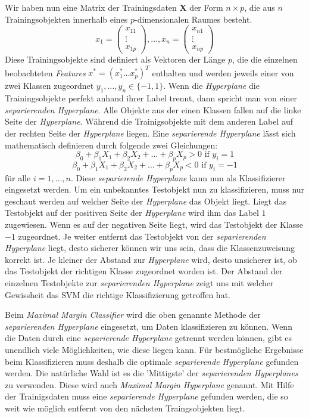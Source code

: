 Wir haben nun eine Matrix der Trainingsdaten $\mathbf{X}$ der Form $n \times p$, 
die aus $n$ Trainingsobjekten innerhalb eines $p$-dimensionalen Raumes besteht.
\[x_1 = \left(\begin{array}{c} x_{11} \\ \vdots \\ x_{1p} \end{array}\right) 
  , \dots, 
  x_n = \left(\begin{array}{c} x_{n1} \\ \vdots \\ x_{np} \end{array}\right) \]
Diese Trainingsobjekte sind definiert als Vektoren der Länge $p$, die die einzelnen beobachteten \textit{Features} 
$x^* = (x_1^* \dots x_p^*)^T$ enthalten und werden jeweils einer von zwei Klassen zugeordnet $y_1,\dots,y_n \in \{-1,1\}$.
Wenn die \textit{Hyperplane} die Trainingsobjekte perfekt anhand ihrer Label trennt,
dann spricht man von einer \textit{separierenden Hyperplane}. 
Alle Objekte aus der einen Klassen fallen auf die linke Seite der \textit{Hyperplane}.
Während die Trainigsobjekte mit dem anderen Label auf der rechten Seite der \textit{Hyperplane} liegen.
Eine \textit{separierende Hyperplane} lässt sich mathematisch definieren durch folgende zwei Gleichungen:
\[\beta_0 + \beta_1X_1 + \beta_2X_2  + \dots + \beta_pX_p> 0 \text{ if } y_i = 1\]
\[\beta_0 + \beta_1X_1 + \beta_2X_2  + \dots + \beta_pX_p< 0 \text{ if } y_i = -1\]
für alle $i = 1 , \dots, n$.
Diese \textit{separierende Hyperplane} kann nun als Klassifizierer eingesetzt werden. 
Um ein unbekanntes Testobjekt nun zu klassifizieren, muss nur geschaut werden auf welcher Seite der \textit{Hyperplane} das Objekt liegt.
Liegt das Testobjekt auf der positiven Seite der \textit{Hyperplane} wird ihm das Label $1$ zugewiesen.
Wenn es auf der negativen Seite liegt, wird das Testobjekt der Klasse $-1$ zugeordnet.
Je weiter entfernt das Testobjekt von der \textit{separierenden Hyperplane} liegt, desto sicherer können wir uns sein,
dass die Klassenzuweisung korrekt ist. Je kleiner der Abstand zur \textit{Hyperplane} wird, desto unsicherer ist,
ob das Testobjekt der richtigen Klasse zugeordnet worden ist. 
Der Abstand der einzelnen Testobjekte zur \textit{separierenden Hyperplane} zeigt uns mit welcher Gewissheit das SVM
die richtige Klassifizierung getroffen hat.\cite[S. 339 - 141]{james_2013}

Beim \textit{Maximal Margin Classifier} wird die oben genannte Methode der \textit{separierenden Hyperplane} eingesetzt,
um Daten klassifizieren zu können. Wenn die Daten durch eine \textit{separierende Hyperplane} getrennt werden können,
gibt es unendlich viele Möglichkeiten, wie diese liegen kann. Für bestmögliche Ergebnisse beim Klassifizieren muss
deshalb die optimale \textit{separierende Hyperplane} gefunden werden. Die natürliche Wahl ist es die 'Mittigste' der
\textit{separierenden Hyperplanes} zu verwenden. Diese wird auch \textit{Maximal Margin Hyperplane} genannt.
Mit Hilfe der Trainigsdaten muss eine \textit{separierende Hyperplane} gefunden werden, die so weit wie möglich entfernt von den
nächsten Traingsobjekten liegt.\cite[S. 1565f.]{noble_2006}


